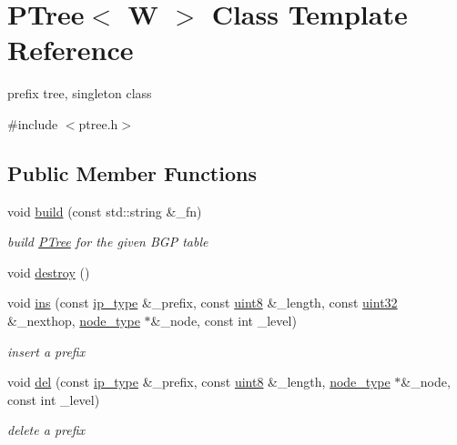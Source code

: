 \hypertarget{classPTree}{\section{P\-Tree$<$ W $>$ Class Template Reference}
\label{classPTree}
}


prefix tree, singleton class  




{\ttfamily \#include $<$ptree.\-h$>$}

\subsection*{Public Member Functions}
\begin{DoxyCompactItemize}
\item 
void \hyperlink{classPTree_aad71c0cee38a70d56ed772ac19a24252}{build} (const std\-::string \&\-\_\-fn)
\begin{DoxyCompactList}\small\item\em build \hyperlink{classPTree}{P\-Tree} for the given B\-G\-P table \end{DoxyCompactList}\item 
void \hyperlink{classPTree_a55a8c6fbed00f8259a7af7a27027fb2b}{destroy} ()
\item 
void \hyperlink{classPTree_a5d77e8de25c1dbc545dda4e95452272f}{ins} (const \hyperlink{classPTree_a946047316df947ae9fbb8a9372c51e77}{ip\-\_\-type} \&\-\_\-prefix, const \hyperlink{types_8h_a34ecedcf03a70dc91e4616212d79267d}{uint8} \&\-\_\-length, const \hyperlink{types_8h_abd01e8e67e3d94cab04ecaaf4f85ac1b}{uint32} \&\-\_\-nexthop, \hyperlink{classPTree_ad1004ef68aec722b83a6055ad8e9db55}{node\-\_\-type} $\ast$\&\-\_\-node, const int \-\_\-level)
\begin{DoxyCompactList}\small\item\em insert a prefix \end{DoxyCompactList}\item 
void \hyperlink{classPTree_ac02cafe6dfc6d31214932bd73645a505}{del} (const \hyperlink{classPTree_a946047316df947ae9fbb8a9372c51e77}{ip\-\_\-type} \&\-\_\-prefix, const \hyperlink{types_8h_a34ecedcf03a70dc91e4616212d79267d}{uint8} \&\-\_\-length, \hyperlink{classPTree_ad1004ef68aec722b83a6055ad8e9db55}{node\-\_\-type} $\ast$\&\-\_\-node, const int \-\_\-level)
\begin{DoxyCompactList}\small\item\em delete a prefix \end{DoxyCompactList}\item 

\end{DoxyCompactItemize}

